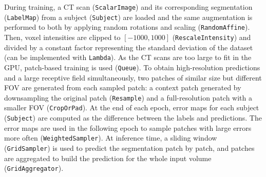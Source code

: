 \textcolor{rev2}{%
During training, a CT scan (\texttt{ScalarImage})
and its corresponding segmentation (\texttt{LabelMap})
from a subject (\texttt{Subject})
are loaded and the same augmentation is performed to both
by applying random rotations and scaling (\texttt{RandomAffine}).
%
Then, voxel intensities are clipped
to $[-1000, 1000]$ (\texttt{RescaleIntensity})
and divided by a constant factor representing
the standard deviation of the dataset (can be implemented with \texttt{Lambda}).
%
As the \ac{CT} scans are too large to fit in the \ac{GPU},
patch-based training is used (\texttt{Queue}).
%
To obtain high-resolution predictions and a large receptive field simultaneously,
two patches of similar size but different \ac{FOV} are generated
from each sampled patch:
a context patch generated by downsampling the original patch (\texttt{Resample})
and a full-resolution patch with a smaller \ac{FOV} (\texttt{CropOrPad}).
%
At the end of each epoch, error maps for each subject (\texttt{Subject})
are computed as the difference between the labels and predictions.
%
The error maps are used in the following epoch to sample patches with large
errors more often (\texttt{WeightedSampler}).
%
At inference time, a sliding window (\texttt{GridSampler}) is used to predict
the segmentation patch by patch, and patches are aggregated to build the
prediction for the whole input volume (\texttt{GridAggregator}).
}

\newcommand{\remove}[1]{\textcolor{red}{\st{#1}}}







